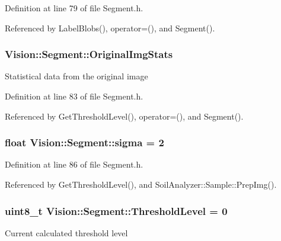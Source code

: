 Definition at line 79 of file Segment.\+h.



Referenced by Label\+Blobs(), operator=(), and Segment().

\hypertarget{class_vision_1_1_segment_ab35cfe5504de7e5ea327991468e6cf3b}{}
\subsubsection[{Original\+Img\+Stats}]{ Vision\+::\+Segment\+::\+Original\+Img\+Stats}\label{class_vision_1_1_segment_ab35cfe5504de7e5ea327991468e6cf3b}
Statistical data from the original image 

Definition at line 83 of file Segment.\+h.



Referenced by Get\+Threshold\+Level(), operator=(), and Segment().

\hypertarget{class_vision_1_1_segment_a0d2c607a6064d8d8fea925fc7bfbbc53}{}
\subsubsection[{sigma}]{\setlength{\rightskip}{0pt plus 5cm}float Vision\+::\+Segment\+::sigma = 2}\label{class_vision_1_1_segment_a0d2c607a6064d8d8fea925fc7bfbbc53}


Definition at line 86 of file Segment.\+h.



Referenced by Get\+Threshold\+Level(), and Soil\+Analyzer\+::\+Sample\+::\+Prep\+Img().

\hypertarget{class_vision_1_1_segment_a44f45a7d08ba6fed38e5c31bc9108291}{}
\subsubsection[{Threshold\+Level}]{\setlength{\rightskip}{0pt plus 5cm}uint8\+\_\+t Vision\+::\+Segment\+::\+Threshold\+Level = 0}\label{class_vision_1_1_segment_a44f45a7d08ba6fed38e5c31bc9108291}
Current calculated threshold level 

